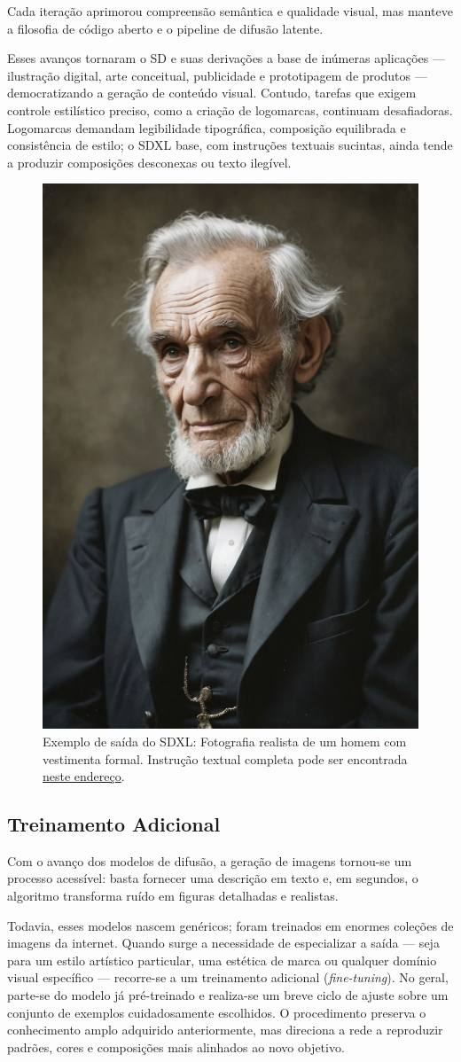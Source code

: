 \documentclass[12pt, %
openright, 
oneside, %
a4paper,    %
brazil]{facom-ufu-abntex2}
\begin{document}
Cada iteração aprimorou compreensão semântica e qualidade visual, mas manteve a filosofia de código aberto e o pipeline de difusão latente.

Esses avanços tornaram o SD e suas derivações a base de inúmeras aplicações — ilustração digital, arte conceitual, publicidade e prototipagem de produtos — democratizando a geração de conteúdo visual. Contudo, tarefas que exigem controle estilístico preciso, como a criação de logomarcas, continuam desafiadoras. Logomarcas demandam legibilidade tipográfica, composição equilibrada e consistência de estilo; o SDXL base, com instruções textuais sucintas, ainda tende a produzir composições desconexas ou texto ilegível.

\begin{figure}[H]
    \centering
	\includegraphics[width=0.35\linewidth]{figuras/sdxl-sample-1.jpeg}
	\caption[Exemplo realista de saída do SDXL]{Exemplo de saída do SDXL: Fotografia realista de um homem com vestimenta formal. Instrução textual completa pode ser encontrada \href{https://civitai.com/images/45346112}{neste endereço}.}
	\label{fig:sdxlSample1}
\end{figure}

\subsection*{Treinamento Adicional}

Com o avanço dos modelos de difusão, a geração de imagens tornou-se um processo acessível: basta fornecer uma descrição em texto e, em segundos, o algoritmo transforma ruído em figuras detalhadas e realistas.

Todavia, esses modelos nascem genéricos; foram treinados em enormes coleções de imagens da internet. Quando surge a necessidade de especializar a saída — seja para um estilo artístico particular, uma estética de marca ou qualquer domínio visual específico — recorre-se a um treinamento adicional (\emph{fine-tuning}). No geral, parte-se do modelo já pré-treinado e realiza-se um breve ciclo de ajuste sobre um conjunto de exemplos cuidadosamente escolhidos. O procedimento preserva o conhecimento amplo adquirido anteriormente, mas direciona a rede a reproduzir padrões, cores e composições mais alinhados ao novo objetivo.
\end{document}
